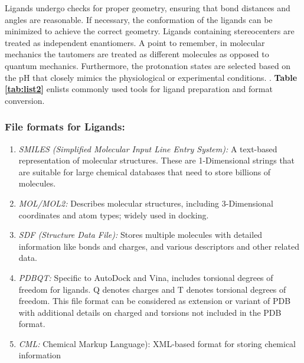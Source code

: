 \documentclass[10pt, a4paper]{book}
\begin{document}
Ligands undergo checks for proper geometry, ensuring that bond distances and angles are reasonable. If necessary, the conformation of the ligands can be minimized to achieve the correct geometry. {}
Ligands containing stereocenters are treated as independent enantiomers. A point to remember, in molecular mechanics the tautomers are treated as different molecules as opposed to quantum mechanics. {} Furthermore, the protonation states are selected based on the pH that closely mimics the physiological or experimental conditions. {}. \textbf{Table \ref{tab:list2}} enlists commonly used tools for ligand preparation and format conversion. 

\subsubsection*{File formats for Ligands:}
\begin{enumerate}
        \item \textit{SMILES (Simplified Molecular Input Line Entry System):} A text-based representation of molecular structures. These are 1-Dimensional strings that are suitable for large chemical databases that need to store billions of molecules. 
	   \item \textit{MOL/MOL2:} Describes molecular structures, including 3-Dimensional coordinates and atom types; widely used in docking.
	   \item \textit{SDF (Structure Data File):} Stores multiple molecules with detailed information like bonds and charges, and various descriptors and other related data. 
	   \item \textit{PDBQT:} Specific to AutoDock and Vina, includes torsional degrees of freedom for ligands. Q denotes charges and T denotes torsional degrees of freedom. This file format can be considered as extension or variant of PDB with additional details on charged and torsions not included in the PDB format. 
	   \item \textit{CML:} Chemical Markup Language): XML-based format for storing chemical information
\end{enumerate}
\end{document}
